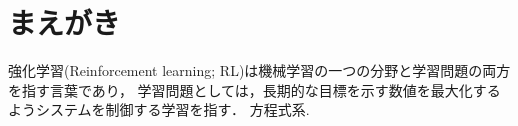 \section{まえがき}
強化学習(Reinforcement learning; RL)は機械学習の一つの分野と学習問題の両方を指す言葉であり，
学習問題としては，長期的な目標を示す数値を最大化するようシステムを制御する学習を指す．
方程式系.
